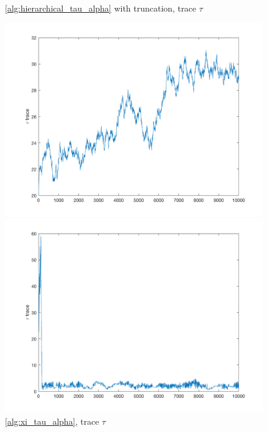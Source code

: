 \documentclass{siamart1116}
\begin{document}
\begin{figure}[H]
    \begin{minipage}{0.48\textwidth}
        \centering
        \caption{\label{fig:moon_centered_trace_tau} \cref{alg:hierarchical_tau_alpha} with truncation, trace $\tau$}
        \includegraphics[width=\linewidth]{graphics/moons/centered_truncated/trace_tau.png}
    \end{minipage} \hfill
    \begin{minipage}{0.48\textwidth}
        \centering
        \caption{\label{fig:moon_noncentered_trace_tau} \cref{alg:xi_tau_alpha}, trace $\tau$}
        \includegraphics[width=\linewidth]{graphics/moons/noncentered_selftuning/trace_tau.png}
    \end{minipage}
\end{figure}
\end{document}
